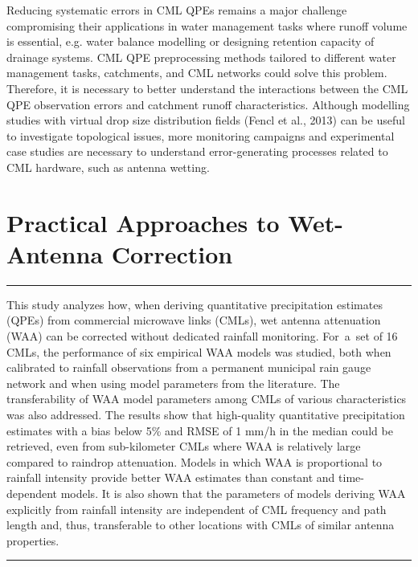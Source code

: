 \documentclass{ctuthesis}\usepackage[]{graphicx}\usepackage[]{color}
\begin{document}
Reducing systematic errors in CML QPEs remains a major challenge compromising their applications in water management tasks where runoff volume is essential, e.g. water balance modelling or designing retention capacity of drainage systems. CML QPE preprocessing methods tailored to different water management tasks, catchments, and CML networks could solve this problem. Therefore, it is necessary to better understand the interactions between the CML QPE observation errors and catchment runoff characteristics. Although modelling studies with virtual drop size distribution fields (Fencl et al., 2013) can be useful to investigate topological issues, more monitoring campaigns and experimental case studies are necessary to understand error-generating processes related to CML hardware, such as antenna wetting.





        


\chapter{Practical Approaches to Wet-Antenna Correction} \label{chap6}

\rule{\textwidth}{0.4pt}
This study analyzes how, when deriving quantitative precipitation estimates (QPEs) from commercial microwave links (CMLs),  wet antenna attenuation (WAA) can be corrected without dedicated rainfall monitoring. For~a~set of 16 CMLs, the performance of six empirical WAA models was studied, both when calibrated to rainfall observations from a permanent municipal rain gauge network and when using model parameters from the literature. The transferability of WAA model parameters among CMLs of various characteristics was also addressed. The results show that high-quality quantitative precipitation estimates with a bias below 5\% and RMSE of 1 mm/h in the median could be retrieved, even from sub-kilometer CMLs where WAA is relatively large compared to raindrop attenuation. Models in which WAA is proportional to rainfall intensity provide better WAA estimates than constant and time-dependent models. It is also shown that the parameters of models deriving WAA explicitly from rainfall intensity are independent of CML frequency and path length and, thus, transferable to other locations with CMLs of similar antenna properties.
\rule[0.2cm]{\textwidth}{0.4pt}
\end{document}
